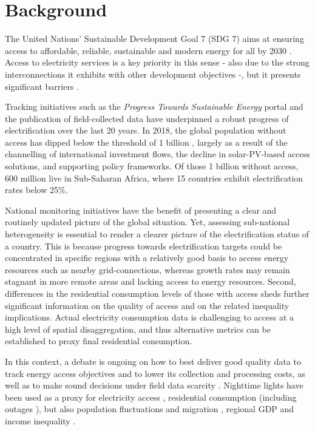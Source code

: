 \documentclass[preprint,12pt]{elsarticle}
\begin{document}
\section{Background}
The United Nations' Sustainable Development Goal 7 (SDG 7) aims at ensuring access to affordable, reliable, sustainable and modern energy for all by 2030 \citep{un2018_sustdevgoals}. Access to electricity services is a key priority in this sense - also due to the strong interconnections it exhibits with other development objectives \citep{nerini2018mapping} -, but it presents significant barriers \citep{bonan_access_2017}.

Tracking initiatives such as the \textit{Progress Towards Sustainable Energy} portal \citep{banerjee2013global} and the publication of field-collected data \citep{aklin_global_2018, macro2009measure} have underpinned a robust progress of electrification over the last 20 years. In 2018, the global population without access has dipped below the threshold of 1 billion \citep{iea_world_2018}, largely as a result of the channelling of international investment flows, the decline in solar-PV-based access solutions, and supporting policy frameworks. Of those 1 billion without access, 600 million live in Sub-Saharan Africa, where 15 countries exhibit electrification rates below 25\%. 

National monitoring initiatives have the benefit of presenting a clear and routinely updated picture of the global situation. Yet, assessing sub-national heterogeneity is essential to render a clearer picture of the electrification status of a country. This is because progress towards electrification targets could be concentrated in specific regions with a relatively good basis to access energy  resources such as nearby grid-connections, whereas growth rates may remain stagnant in more remote areas and lacking access to energy resources. Second, differences in the residential consumption levels of those with access sheds further significant information on the quality of access and on the related inequality implications. Actual electricity consumption data is challenging to access at a high level of spatial disaggregation, and thus alternative metrics can be established to proxy final residential consumption.

In this context, a debate is ongoing on how to best deliver good quality data to track energy access objectives and to lower its collection and processing costs, as well as to make sound decisions under field data scarcity \citep{cader_overcoming_2018}. Nighttime lights have been used as a proxy for electricity access \citep{doll_estimating_2010, elvidge_whos_2011, min_detection_2013}, residential consumption \citep{coscieme_thermodynamic_2014, he_spatiotemporal_2012, townsend_use_2010, fehrer2018spatial, shi2018exploring,baldwin2017utilizing} (including outages \citep{burke2017verification, wang2018monitoring}), but also population fluctuations and migration \citep{bharti_measuring_2016, bharti_fluctuations_2018}, regional GDP \citep{bickenbach_night_2016} and income inequality \citep{mveyange_night_2015}.
\end{document}
